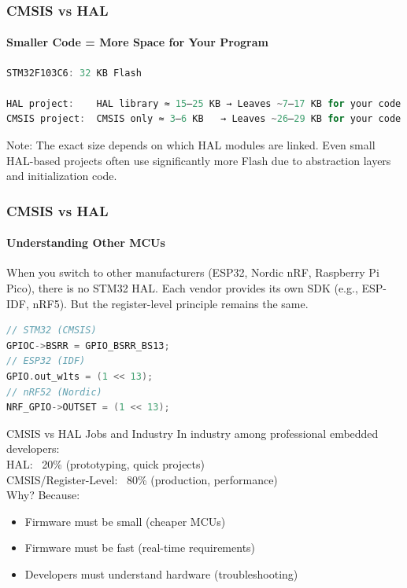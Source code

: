 \documentclass{beamer}
\begin{document}
\begin{frame}[fragile]
	\frametitle{CMSIS vs HAL}
	\framesubtitle{Smaller Code = More Space for Your Program}
	\begin{lstlisting}[language=C]
STM32F103C6: 32 KB Flash
		
HAL project:    HAL library ≈ 15–25 KB → Leaves ~7–17 KB for your code
CMSIS project:  CMSIS only ≈ 3–6 KB   → Leaves ~26–29 KB for your code
	\end{lstlisting}
	\vspace{0.2cm}
	\footnotesize{Note: The exact size depends on which HAL modules are linked. 
		Even small HAL-based projects often use significantly more Flash due to 
		abstraction layers and initialization code.}
\end{frame}
\begin{frame}[fragile]
	\frametitle{CMSIS vs HAL}
	\framesubtitle{Understanding Other MCUs}
	When you switch to other manufacturers (ESP32, Nordic nRF, Raspberry Pi Pico),	there is no STM32 HAL. Each vendor provides its own SDK (e.g., ESP-IDF, nRF5).
	But the register-level principle remains the same.
	\begin{lstlisting}[language=C]
// STM32 (CMSIS)
GPIOC->BSRR = GPIO_BSRR_BS13;
// ESP32 (IDF)
GPIO.out_w1ts = (1 << 13);
// nRF52 (Nordic)
NRF_GPIO->OUTSET = (1 << 13);
	\end{lstlisting}
\end{frame}
\begin{frame}{CMSIS vs HAL}
	{Jobs and Industry}
	In industry among professional embedded developers:\\
	\vspace{0.2cm}
	HAL: ~20\% (prototyping, quick projects)\\
	CMSIS/Register-Level: ~80\% (production, performance)\\
	\vspace{0.2cm}
	Why? Because:
	\begin{itemize}
		\item Firmware must be small (cheaper MCUs)
		\item Firmware must be fast (real-time requirements)
		\item Developers must understand hardware (troubleshooting)
	\end{itemize}
\end{frame}
\end{document}
